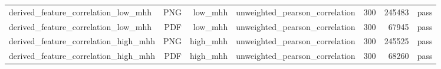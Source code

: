 \begin{table}[htbp]
{\begin{tabular}{lrrrrrr}
derived\_feature\_correlation\_low\_mhh & PNG & low\_mhh & unweighted\_pearson\_correlation & 300 & 245483 & pass \\
derived\_feature\_correlation\_low\_mhh & PDF & low\_mhh & unweighted\_pearson\_correlation & 300 & 67945 & pass \\
derived\_feature\_correlation\_high\_mhh & PNG & high\_mhh & unweighted\_pearson\_correlation & 300 & 245525 & pass \\
derived\_feature\_correlation\_high\_mhh & PDF & high\_mhh & unweighted\_pearson\_correlation & 300 & 68260 & pass \\
\bottomrule
\end{tabular}
}
\end{table}
